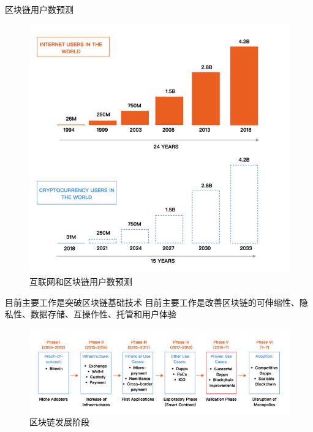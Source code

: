 \documentclass[11pt]{beamer}
\begin{document}
\begin{frame}{区块链用户数预测}
	\begin{figure}
		\centering
		\includegraphics[width=0.7\linewidth, height=0.7\textheight]{figures/compareinternetandblockchain}
		\caption{互联网和区块链用户数预测}
		\label{fig:compareinternetandblockchain}
	\end{figure}
	
\end{frame}



\begin{frame}{目前主要工作是突破区块链基础技术}
	目前主要工作是改善区块链的可伸缩性、隐私性、数据存储、互操作性、托管和用户体验
\begin{figure}
	\centering
	\includegraphics[width=0.9\linewidth]{figures/blockchainsteps}
	\caption{区块链发展阶段}
	\label{fig:blockchainsteps}
\end{figure}

\end{frame}
\end{document}
